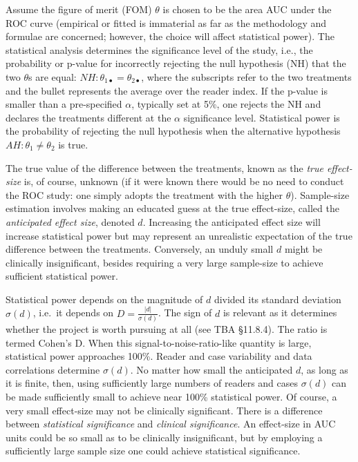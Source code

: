 \documentclass[
]{book}
\begin{document}
Assume the figure of merit (FOM) \(\theta\) is chosen to be the area AUC under the ROC curve (empirical or fitted is immaterial as far as the methodology and formulae are concerned; however, the choice will affect statistical power). The statistical analysis determines the significance level of the study, i.e., the probability or p-value for incorrectly rejecting the null hypothesis (NH) that the two \(\theta\)s are equal: \(NH: \theta_{1\bullet} = \theta_{2\bullet}\), where the subscripts refer to the two treatments and the bullet represents the average over the reader index. If the p-value is smaller than a pre-specified \(\alpha\), typically set at 5\%, one rejects the NH and declares the treatments different at the \(\alpha\) significance level. Statistical power is the probability of rejecting the null hypothesis when the alternative hypothesis \(AH: \theta_1 \neq \theta_2\) is true.

The true value of the difference between the treatments, known as the \emph{true effect-size} is, of course, unknown (if it were known there would be no need to conduct the ROC study: one simply adopts the treatment with the higher \(\theta\)). Sample-size estimation involves making an educated guess at the true effect-size, called the \emph{anticipated effect size}, denoted \(d\). Increasing the anticipated effect size will increase statistical power but may represent an unrealistic expectation of the true difference between the treatments. Conversely, an unduly small \(d\) might be clinically insignificant, besides requiring a very large sample-size to achieve sufficient statistical power.

Statistical power depends on the magnitude of \(d\) divided its standard deviation \(\sigma(d)\), i.e.~it depends on \(D=\frac{\left | d \right |}{\sigma (d)}\). The sign of \(d\) is relevant as it determines whether the project is worth pursuing at all (see TBA §11.8.4). The ratio is termed \citep{cohen1988statistical} Cohen's D. When this signal-to-noise-ratio-like quantity is large, statistical power approaches 100\%. Reader and case variability and data correlations determine \(\sigma(d)\). No matter how small the anticipated \(d\), as long as it is finite, then, using sufficiently large numbers of readers and cases \(\sigma(d)\) can be made sufficiently small to achieve near 100\% statistical power. Of course, a very small effect-size may not be clinically significant. There is a difference between \emph{statistical significance} and \emph{clinical significance}. An effect-size in AUC units could be so small as to be clinically insignificant, but by employing a sufficiently large sample size one could achieve statistical significance.
\end{document}
